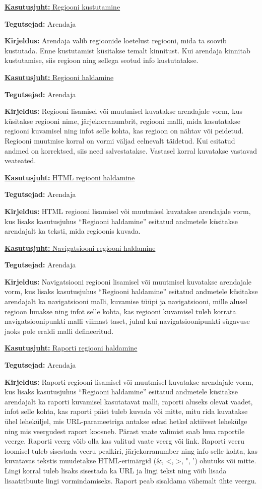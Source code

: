 \documentclass[a4paper,12pt]{article} %
\begin{document}
\underline{\textbf{Kasutusjuht:} Regiooni kustutamine}
\par
\textbf{Tegutsejad:} Arendaja
\par
\textbf{Kirjeldus:} Arendaja valib regioonide loetelust regiooni, mida ta soovib kustutada. Enne kustutamist küsitakse temalt kinnitust. Kui arendaja kinnitab kustutamise, siis regioon ning sellega seotud info kustutatakse.

\underline{\textbf{Kasutusjuht:} Regiooni haldamine}
\par
\textbf{Tegutsejad:} Arendaja
\par
\textbf{Kirjeldus:} Regiooni lisamisel või muutmisel kuvatakse arendajale vorm, kus küsitakse regiooni nime, järjekorranumbrit, regiooni malli, mida kasutatakse regiooni kuvamisel ning infot selle kohta, kas regioon on nähtav või peidetud. Regiooni muutmise korral on vormi väljad eelnevalt täidetud. Kui esitatud andmed on korrektsed, siis need salvestatakse. Vastasel korral kuvatakse vastavad veateated.

\underline{\textbf{Kasutusjuht:} HTML regiooni haldamine}
\par
\textbf{Tegutsejad:} Arendaja
\par
\textbf{Kirjeldus:} HTML regiooni lisamisel või muutmisel kuvatakse arendajale vorm, kus lisaks kasutusjuhus ``Regiooni haldamine'' esitatud andmetele küsitakse arendajalt ka teksti, mida regioonis kuvada.

\underline{\textbf{Kasutusjuht:} Navigatsiooni regiooni haldamine}
\par
\textbf{Tegutsejad:} Arendaja
\par
\textbf{Kirjeldus:} Navigatsiooni regiooni lisamisel või muutmisel kuvatakse arendajale vorm, kus lisaks kasutusjuhus ``Regiooni haldamine'' esitatud andmetele küsitakse arendajalt ka navigatsiooni malli, kuvamise tüüpi ja navigatsiooni, mille alusel regioon luuakse ning infot selle kohta, kas regiooni kuvamisel tuleb korrata navigatsioonipunkti malli viimast taset, juhul kui navigatsioonipunkti sügavuse jaoks pole eraldi malli defineeritud.

\underline{\textbf{Kasutusjuht:} Raporti regiooni haldamine}
\par
\textbf{Tegutsejad:} Arendaja
\par
\textbf{Kirjeldus:} Raporti regiooni lisamisel või muutmisel kuvatakse arendajale vorm, kus lisaks kasutusjuhus ``Regiooni haldamine'' esitatud andmetele küsitakse arendajalt ka raporti kuvamisel kasutatavat malli, raporti aluseks olevat vaadet, infot selle kohta, kas raporti päist tuleb kuvada või mitte, mitu rida kuvatakse ühel leheküljel, mis URL-parameetriga antakse edasi hetkel aktiivset lehekülge ning mis veergudest raport koosneb. Pärast vaate valimist saab luua raportile veerge. Raporti veerg võib olla kas valitud vaate veerg või link. Raporti veeru loomisel tuleb sisestada veeru pealkiri, järjekorranumber ning info selle kohta, kas kuvatavas tekstis muudetakse HTML-erimärgid (\&, <, >, ", ') ohutuks või mitte. Lingi korral tuleb lisaks sisestada ka URL ja lingi tekst ning võib lisada lisaatribuute lingi vormindamiseks. Raport peab sisaldama vähemalt ühte veergu.
\end{document}
